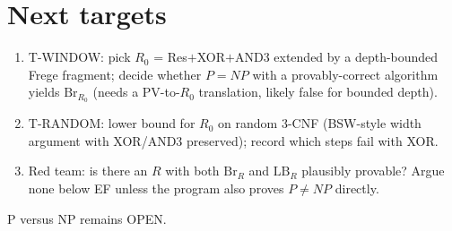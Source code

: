 \documentclass[11pt]{article}
\begin{document}
\section{Next targets}
\begin{enumerate}
\item T-WINDOW: pick $R_0$ = Res$+$XOR$+$AND3 extended by a depth-bounded Frege fragment; decide whether $P=NP$ with a provably-correct algorithm yields $\mathrm{Br}_{R_0}$ (needs a PV-to-$R_0$ translation, likely false for bounded depth).
\item T-RANDOM: lower bound for $R_0$ on random 3-CNF (BSW-style width argument with XOR/AND3 preserved); record which steps fail with XOR.
\item Red team: is there an $R$ with both $\mathrm{Br}_R$ and $\mathrm{LB}_R$ plausibly provable? Argue none below EF unless the program also proves $P\ne NP$ directly.
\end{enumerate}
\noindent P versus NP remains OPEN.
\end{document}
